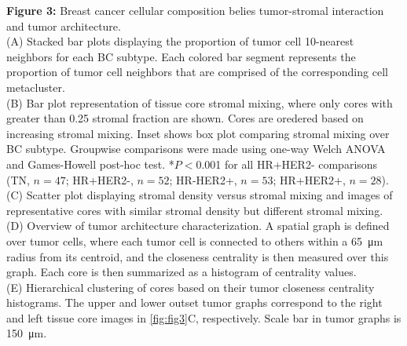 \documentclass[preprint,review,3p,12pt]{elsarticle}
\begin{document}
\noindent
\textbf{Figure 3:} Breast cancer cellular composition belies tumor-stromal interaction and tumor architecture. \\
(A) Stacked bar plots displaying the proportion of tumor cell 10-nearest neighbors for each BC subtype. Each colored bar segment represents the proportion of tumor cell neighbors that are comprised of the corresponding cell metacluster. \\
(B) Bar plot representation of tissue core stromal mixing, where only cores with greater than 0.25 stromal fraction are shown. Cores are oredered based on increasing stromal mixing. Inset shows box plot comparing stromal mixing over BC subtype. Groupwise comparisons were made using one-way Welch ANOVA and Games-Howell post-hoc test. *$P<$0.001 for all HR+HER2- comparisons (TN, $n=47$; HR+HER2-, $n=52$; HR-HER2+, $n=53$; HR+HER2+, $n=28$). \\
(C) Scatter plot displaying stromal density versus stromal mixing and images of representative cores with similar stromal density but different stromal mixing.\\
(D) Overview of tumor architecture characterization. A spatial graph is defined over tumor cells, where each tumor cell is connected to others within a \SI{65}{\micro\meter} radius from its centroid, and the closeness centrality is then measured over this graph. Each core is then summarized as a histogram of centrality values. \\
(E) Hierarchical clustering of cores based on their tumor closeness centrality histograms. The upper and lower outset tumor graphs correspond to the right and left tissue core images in \autoref{fig:fig3}C, respectively. Scale bar in tumor graphs is \SI{150}{\micro\meter}.
\end{document}
